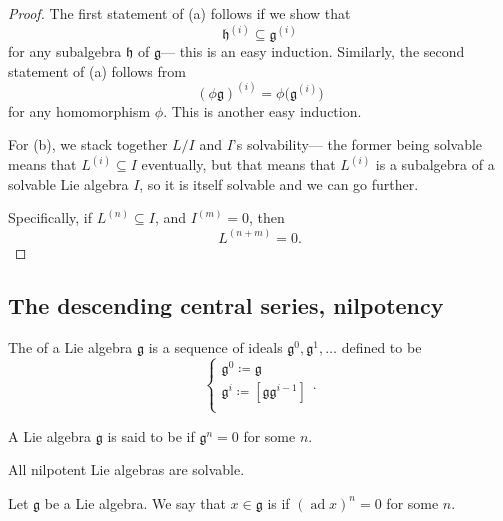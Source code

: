 \documentclass{article}
\newcommand{\lb}[1]{\ensuremath{\left[{#1}\right]}}
\DeclareMathOperator{\ad}{ad}
\newcommand{\frkg}{{\ensuremath{\mathfrak{g}}}}
\newcommand{\frkh}{{\ensuremath{\mathfrak{h}}}}
\begin{document}
\begin{proof}
    The first statement of (a) follows if we show that
    \[
        \frkh^{(i)} \subseteq \frkg^{(i)}
    \]
    for any subalgebra $\frkh$ of $\frkg$--- this is an easy induction.
    Similarly, the second statement of (a) follows from
    \[
        (\phi\frkg)^{(i)} 
        = 
        \phi\Big(\frkg^{(i)}\Big)
    \]
    for any homomorphism $\phi$.
    This is another easy induction.

    For (b), we stack together $L/I$ and $I$'s solvability--- the former being solvable means that $L^{(i)} \subseteq I$ eventually, but that means that $L^{(i)}$ is a subalgebra of a solvable Lie algebra $I$, so it is itself solvable and we can go further.

    Specifically, if $L^{(n)} \subseteq I$, and $I^{(m)} = 0$, then
    \[
        L^{(n+m)}
        =
        0.
    \]


\end{proof}

\subsection{The descending central series, nilpotency}

\begin{definition}
    The  of a Lie algebra $\frkg$ is a sequence of ideals $\frkg^0, \frkg^1, \ldots$ defined to be
    \[
        \begin{cases}
            \frkg^0 \coloneq \frkg \\
            \frkg^i \coloneq \lb{\frkg\frkg^{i-1}} \\
        \end{cases}.
    \]
\end{definition}

\begin{definition}
    A Lie algebra $\frkg$ is said to be  if $\frkg^n = 0$ for some $n$.
\end{definition}

\begin{proposition}
    All nilpotent Lie algebras are solvable.
\end{proposition}

\begin{definition}
    Let $\frkg$ be a Lie algebra.
    We say that $x \in \frkg$ is  if $(\ad x)^n = 0$ for some $n$.
\end{definition}
\end{document}
